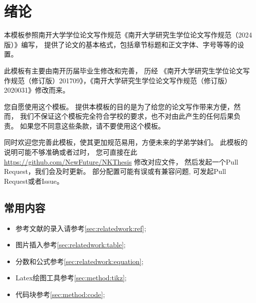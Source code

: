 
\chapter{绪论}
\label{chpt:introduction}


本模板参照南开大学学位论文写作规范《南开大学研究生学位论文写作规范（2024版）》编写，
提供了论文的基本格式，包括章节标题和正文字体、字号等等的设置。

此模板有主要由南开历届毕业生修改和完善，
历经 《南开大学研究生学位论文写作规范（修订版）201709》，《南开大学研究生学位论文写作规范（修订版）2020031》修改而来。

您自愿使用这个模板。
提供本模板的目的是为了给您的论文写作带来方便，然而，
我们不保证这个模板完全符合学校的要求，也不对由此产生的任何后果负责。
如果您不同意这些条款，请不要使用这个模板。

同时欢迎您完善此模板，使其更加规范易用，方便未来的学弟学妹们。
此模板的说明可能不够准确或者过时，
您可直接在此 \url{https://github.com/NewFuture/NKThesis} 修改对应文件，
然后发起一个Pull Request，我们会及时更新。
部分配置可能有误或有兼容问题, 可发起Pull Request或者Issue。

\section{常用内容}

\begin{itemize}
  \item 参考文献的录入请参考\ref{sec:relatedwork:ref};
  \item 图片插入参考\ref{sec:relatedwork:table};
  \item 分数和公式参考\ref{sec:relatedwork:equation};
  \item Latex绘图工具参考\ref{sec:method:tikz};
  \item 代码块参考\ref{sec:method:code};
\end{itemize}